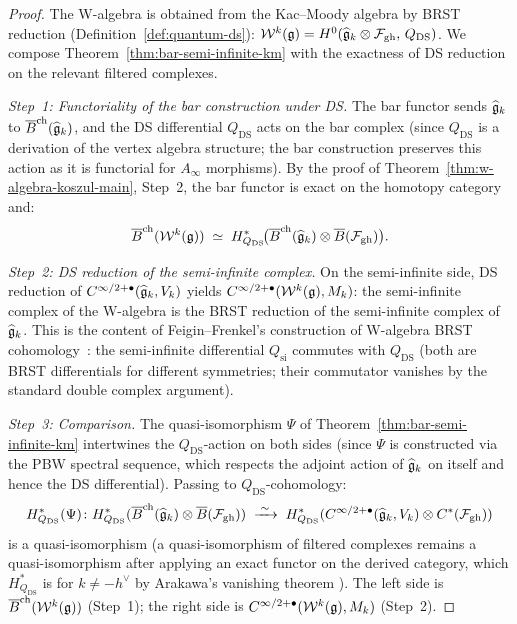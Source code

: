 \begin{proof}
The W-algebra is obtained from the Kac--Moody algebra by BRST
reduction (Definition~\ref{def:quantum-ds}):
$\mathcal{W}^k(\mathfrak{g}) = H^0(
\widehat{\mathfrak{g}}_k \otimes \mathcal{F}_{\mathrm{gh}},\,
Q_{\mathrm{DS}})$.
We compose Theorem~\ref{thm:bar-semi-infinite-km} with the exactness
of DS reduction on the relevant filtered complexes.

\emph{Step~1: Functoriality of the bar construction under DS.}
The bar functor sends $\widehat{\mathfrak{g}}_k$ to
$\overline{B}^{\mathrm{ch}}(\widehat{\mathfrak{g}}_k)$, and the DS differential
$Q_{\mathrm{DS}}$ acts on the bar complex (since $Q_{\mathrm{DS}}$
is a derivation of the vertex algebra structure; the bar construction
preserves this action as it is functorial for $A_\infty$ morphisms).
By the proof of Theorem~\ref{thm:w-algebra-koszul-main}, Step~2,
the bar functor is exact on the homotopy category and:
\[
\overline{B}^{\mathrm{ch}}(\mathcal{W}^k(\mathfrak{g}))
\;\simeq\;
H^*_{Q_{\mathrm{DS}}}\!\bigl(
\overline{B}^{\mathrm{ch}}(\widehat{\mathfrak{g}}_k)
\otimes \overline{B}(\mathcal{F}_{\mathrm{gh}})\bigr).
\]

\emph{Step~2: DS reduction of the semi-infinite complex.}
On the semi-infinite side, DS reduction of
$C^{\infty/2+\bullet}(\widehat{\mathfrak{g}}_k, V_k)$ yields
$C^{\infty/2+\bullet}(\mathcal{W}^k(\mathfrak{g}), M_k)$:
the semi-infinite complex of the W-algebra is the BRST
reduction of the semi-infinite complex of $\widehat{\mathfrak{g}}_k$.
This is the content of Feigin--Frenkel's construction of
W-algebra BRST cohomology~\cite{Feigin-Frenkel}: the
semi-infinite differential $Q_{\mathrm{si}}$ commutes with
$Q_{\mathrm{DS}}$ (both are BRST differentials for different
symmetries; their commutator vanishes by the standard double
complex argument).

\emph{Step~3: Comparison.}
The quasi-isomorphism $\Psi$ of
Theorem~\ref{thm:bar-semi-infinite-km} intertwines the
$Q_{\mathrm{DS}}$-action on both sides (since $\Psi$ is
constructed via the PBW spectral sequence, which respects the
adjoint action of $\widehat{\mathfrak{g}}_k$ on itself and hence the
DS differential).  Passing to $Q_{\mathrm{DS}}$-cohomology:
\[
H^*_{Q_{\mathrm{DS}}}(\Psi) \colon
H^*_{Q_{\mathrm{DS}}}(\overline{B}^{\mathrm{ch}}(\widehat{\mathfrak{g}}_k)
\otimes \overline{B}(\mathcal{F}_{\mathrm{gh}}))
\;\xrightarrow{\;\sim\;}\;
H^*_{Q_{\mathrm{DS}}}(
C^{\infty/2+\bullet}(\widehat{\mathfrak{g}}_k, V_k)
\otimes C^*(\mathcal{F}_{\mathrm{gh}}))
\]
is a quasi-isomorphism (a quasi-isomorphism of filtered complexes
remains a quasi-isomorphism after applying an exact functor on the
derived category, which $H^*_{Q_{\mathrm{DS}}}$ is for
$k \neq -h^\vee$ by Arakawa's vanishing theorem
\cite{Ara15}).  The left side is
$\overline{B}^{\mathrm{ch}}(\mathcal{W}^k(\mathfrak{g}))$ (Step~1); the right
side is
$C^{\infty/2+\bullet}(\mathcal{W}^k(\mathfrak{g}), M_k)$ (Step~2).
\end{proof}

